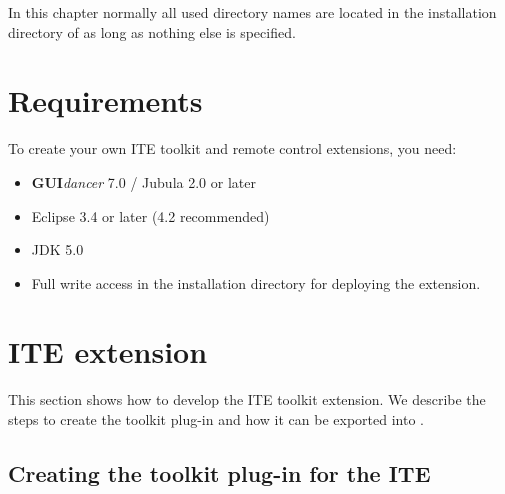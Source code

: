 In this chapter normally all used directory names are located in the
installation directory of \app{} as long as nothing else is specified.

\section{Requirements}
To create your own ITE toolkit and remote control extensions, you need:
\begin{itemize}
\item \textbf{GUI}\emph{dancer} 7.0 / Jubula 2.0 or later
\item Eclipse 3.4 or later (4.2 recommended)
\item JDK 5.0
\item Full write access in the \app{} installation directory for deploying the
extension.
\end{itemize}

\section{ITE extension}
\label{iteExtension}

This section shows how to develop the ITE toolkit extension. We describe the
steps to create the toolkit plug-in and how it can be exported into \app{}.

\subsection{Creating the toolkit plug-in for the ITE}


